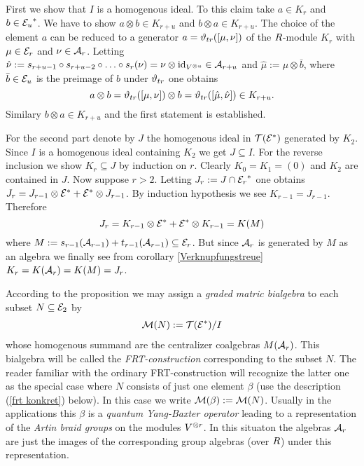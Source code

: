 \documentclass[twoside,12pt]{article}
\begin{document}
\begin{Pf}
First we show that $I$ is a homogenous ideal. To this claim take
$a \in K_r$ and $b \in{{\cal E}_{u}}^*$. We have to show 
$a \otimes b \in K_{r+u}$ and $b \otimes a \in K_{r+u}$. The choice of the element
$a$ can be reduced to a generator $a={\vartheta}_{tr}([\mu,\nu])$ of the $R$-module $K_r$
with $\mu 
\in{\cal E}_r$ and $\nu \in {\cal A}_r$.
Letting 
$\hat{\nu}:=s_{r+u-1} \circ s_{r+u-2} \circ \ldots \circ s_{r}(\nu) =
\nu \otimes {\rm id}_{V^{\otimes u}} \in {\cal A}_{r+u}$ and
$\hat\mu :=\mu \otimes \bar b$, where $\bar b\in {\cal E}_{u}$ is the preimage of $b$
under ${\vartheta}_{tr}$ one obtains
\[ a \otimes b = {\vartheta}_{tr}([\mu,\nu]) \otimes b = {\vartheta}_{tr}([\hat\mu ,\hat{\nu}]) \in
K_{r+u}.\]
Similary $b \otimes a \in K_{r+u}$ and the first statement is
established.\Ab

For the second part denote by $J$ the homogenous ideal in
${\cal T}({{\cal E}}^*)$ generated by $K_2$. Since $I$ is a homogenous ideal
containing $K_2$ we get $J\subseteq I$. For the reverse inclusion we
show $K_r\subseteq J$ by induction on $r$. Clearly
$K_0=K_1=(0)$ and $K_2$ are contained in $J$. Now suppose $r>2$.
Letting $J_r:=J\cap{{\cal E}_r}^*$ one obtains $J_r=J_{r-1}\otimes {{\cal E}}^* +{{\cal E}}^*\otimes
J_{r-1}$. By induction hypothesis we see $K_{r-1} = J_{r-1}$. Therefore
\[ J_r=K_{r-1}\otimes {{\cal E}}^* + {{\cal E}}^* \otimes K_{r-1}=
K(M) \]
where $M:=s_{r-1}({\cal A}_{r-1}) + t_{r-1}({\cal A}_{r-1}) \subseteq
{\cal E}_r$. But since ${\cal A}_r$ is generated by $M$ as an algebra
we finally see from corollary \ref{Verknupfungstreue}
$K_r =K({\cal A}_r)=K(M)=J_r$.
\end{Pf}

According to the proposition we may assign a
{\em graded matric bialgebra} to each subset $N\subseteq {\cal E}_{2}$ by
\begin{eqnarray}  \label{FRT allgemein}
{\cal M}(N):={\cal T}({{\cal E}}^*)/I
\end{eqnarray}
whose homogenous summand are the centralizer coalgebras $M({\cal A}_r)$.
This bialgebra will be called the {\em FRT-construction} corresponding
to the subset $N$. The reader familiar with the ordinary
FRT-construction will recognize the latter one as the special case
where $N$ consists of just one element $\beta$ (use the description
(\ref{frt konkret}) below). In this case we write
${\cal M}(\beta):={\cal M}(N)$. Usually in the applications this $\beta$ is a
{\em quantum Yang-Baxter operator} leading to a representation of
the {\em Artin braid groups} on the modules $V^{\otimes r}$. In this situaton
the algebras ${\cal A}_r$ are just the images of the corresponding
group algebras (over $R$) under this representation.\Ab
\end{document}
